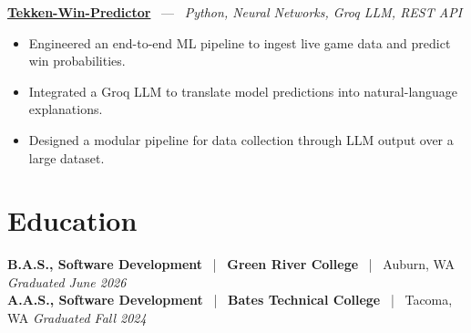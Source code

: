\documentclass[10pt, letterpaper]{article}
\newcommand{\jobhead}[4]{%
  \vspace{5pt}%
  {\bfseries\color{dark}#1}%
  ~{\color{light}|}~%
  {\bfseries\color{navy}#2}%
  ~{\color{light}|}~%
  {\color{light}#3}%
  \hfill{\color{light}\small\textit{#4}}\\[-2pt]%
}
\newcommand{\projhead}[3]{%
  \vspace{5pt}%
  {\bfseries\color{dark}\href{#2}{#1}}%
  ~{\color{light}---}~%
  {\color{light}\small\textit{#3}}\\[-2pt]%
}
\begin{document}
\projhead{Tekken-Win-Predictor}{}{Python, Neural Networks, Groq LLM, REST API}
\begin{itemize}
  \item Engineered an end-to-end ML pipeline to ingest live game data and predict win probabilities.
  \item Integrated a Groq LLM to translate model predictions into natural-language explanations.
  \item Designed a modular pipeline for data collection through LLM output over a large dataset.
\end{itemize}

\section{Education}

\jobhead{B.A.S., Software Development}{Green River College}{Auburn, WA}{Graduated June 2026}
\jobhead{A.A.S., Software Development}{Bates Technical College}{Tacoma, WA}{Graduated Fall 2024}
\end{document}
